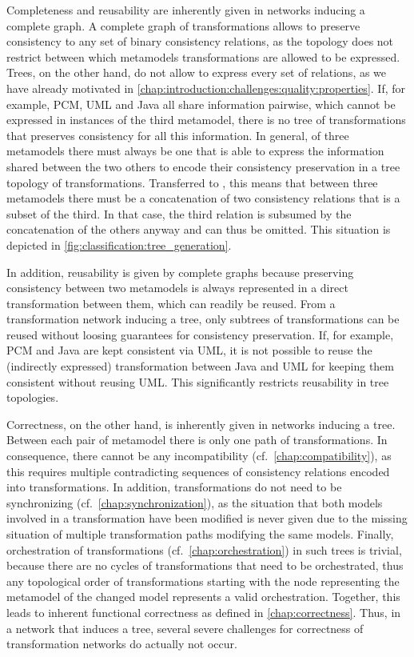 Completeness and reusability are inherently given in networks inducing a complete graph.
A complete graph of transformations allows to preserve consistency to any set of binary consistency relations, as the topology does not restrict between which metamodels transformations are allowed to be expressed.
Trees, on the other hand, do not allow to express every set of relations, as we have already motivated in \autoref{chap:introduction:challenges:quality:properties}.
If, for example, \gls{PCM}, \gls{UML} and Java all share information pairwise, which cannot be expressed in instances of the third metamodel, there is no tree of transformations that preserves consistency for all this information.
In general, of three metamodels there must always be one that is able to express the information shared between the two others to encode their consistency preservation in a tree topology of transformations.
Transferred to \modellevelconsistencyrelations, this means that between three metamodels there must be a concatenation of two consistency relations that is a subset of the third.
In that case, the third relation is subsumed by the concatenation of the others anyway and can thus be omitted.
This situation is depicted in \autoref{fig:classification:tree_generation}.

In addition, reusability is given by complete graphs because preserving consistency between two metamodels is always represented in a direct transformation between them, which can readily be reused.
From a transformation network inducing a tree, only subtrees of transformations can be reused without loosing guarantees for consistency preservation.
If, for example, \gls{PCM} and Java are kept consistent via \gls{UML}, it is not possible to reuse the (indirectly expressed) transformation between Java and \gls{UML} for keeping them consistent without reusing \gls{UML}.
This significantly restricts reusability in tree topologies.

Correctness, on the other hand, is inherently given in networks inducing a tree.
Between each pair of metamodel there is only one path of transformations.
In consequence, there cannot be any incompatibility (cf.\ \autoref{chap:compatibility}), as this requires multiple contradicting sequences of consistency relations encoded into transformations.
In addition, transformations do not need to be synchronizing (cf.\ \autoref{chap:synchronization}), as the situation that both models involved in a transformation have been modified is never given due to the missing situation of multiple transformation paths modifying the same models.
Finally, orchestration of transformations (cf.\ \autoref{chap:orchestration}) in such trees is trivial, because there are no cycles of transformations that need to be orchestrated, thus any topological order of transformations starting with the node representing the metamodel of the changed model represents a valid orchestration.
Together, this leads to inherent functional correctness as defined in \autoref{chap:correctness}.
Thus, in a network that induces a tree, several severe challenges for correctness of transformation networks do actually not occur.

